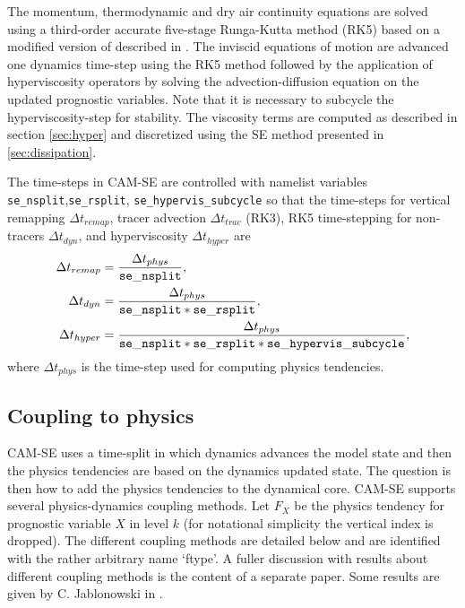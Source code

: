 \documentclass{agujournal}
\begin{document}
The momentum, thermodynamic and dry air continuity equations are solved using a third-order accurate five-stage Runga-Kutta method (RK5) based on a modified version of \cite{KG1984MCSb,KG1984MCS} described in \cite{GU2016GMD}. The inviscid equations of motion are advanced one dynamics time-step using the RK5 method followed by the application of hyperviscosity operators by solving the advection-diffusion equation on the updated prognostic variables. Note that it is necessary to subcycle the hyperviscosity-step for stability. The viscosity terms are computed as described in section \ref{sec:hyper} and discretized using the SE method presented in \ref{sec:dissipation}.

{\color{red}{[How is tracer advection coupled to dry air continuity equation??]}} 

The time-steps in CAM-SE are controlled with namelist variables {\tt{se\_nsplit}},{\tt{se\_rsplit}},
{\tt{se\_hypervis\_subcycle}}  so that the time-steps for vertical remapping $\Delta t_{remap}$, tracer advection $\Delta t_{trac}$ (RK3), RK5 time-stepping for non-tracers $\Delta t_{dyn}$, and hyperviscosity $\Delta t_{hyper}$ are
\begin{align}
\Delta t_{remap}&=\frac{\Delta t_{phys}}{\tt{se\_nsplit}},\\
\Delta t_{dyn}&=\frac{\Delta t_{phys}}{\tt{se\_nsplit*se\_rsplit}},\\
\Delta t_{hyper}&=\frac{\Delta t_{phys}}{\tt{se\_nsplit*se\_rsplit*se\_hypervis\_subcycle}},\\
\end{align}
where $\Delta t_{phys}$ is the time-step used for computing physics tendencies.
%
\subsection{Coupling to physics}
CAM-SE uses a time-split {\color{red}{[(CHECK if it is process or time split)]}} in which dynamics advances the model state and then the physics tendencies are based on the dynamics updated state. The question is then how to add the physics tendencies to the dynamical core. CAM-SE supports several physics-dynamics coupling methods. Let $F_X$ be the physics tendency for prognostic variable $X$ in level $k$ (for notational simplicity the vertical index is dropped). The different coupling methods are detailed below and are identified with the rather arbitrary name `ftype'. A fuller discussion with results about different coupling methods is the content of a separate paper. Some results are given by C. Jablonowski in \cite[][; see section 6]{GetAl2016}.
\end{document}
